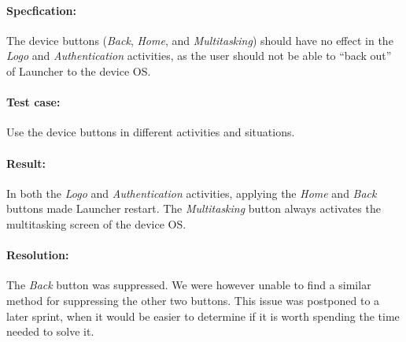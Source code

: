 \paragraph{Specfication:} The device buttons (\textit{Back}, \textit{Home}, and \textit{Multitasking}) should have no effect in the \textit{Logo} and \textit{Authentication} activities, as the user should not be able to ``back out'' of Launcher to the device OS.
\paragraph{Test case:} Use the device buttons in different activities and situations.
\paragraph{Result:} In both the \textit{Logo} and \textit{Authentication} activities, applying the \textit{Home} and \textit{Back} buttons made Launcher restart. The \textit{Multitasking} button always activates the multitasking screen of the device OS.
\paragraph{Resolution:} The \textit{Back} button was suppressed. We were however unable to find a similar method for suppressing the other two buttons. This issue was postponed to a later sprint, when it would be easier to determine if it is worth spending the time needed to solve it.







